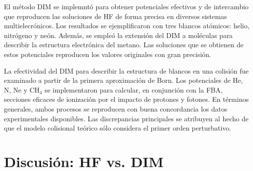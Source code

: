 El método DIM se implemntó para obtener potenciales efectivos y de 
intercambio que reproducen las soluciones de HF de forma precisa en 
diversos sistemas multielecrónicos. Los resultados se ejemplificaron con 
tres blancos atómicos: helio, nitrógeno y neón. Además, se empleó la 
extensión del DIM a moléculas para describir la estructura electrónica 
del metano. Las soluciones que se obtienen de estos potenciales 
reproducen los valores originales con gran precisión. 

La efectividad del DIM para describir la estructura de blancos en una 
colisión fue examinado a partir de la primera aproximación de Born. Los 
potenciales de He, N, Ne y CH$_4$ se implementaron para calcular, en 
conjunción con la FBA, secciones eficaces de ionización por el impacto 
de protones y fotones. En términos generales, ambos procesos se 
reproducen con buena concordancia los datos experimentales disponibles. 
Las discrepancias principales se atribuyen al hecho de que el modelo 
colisional teórico sólo considera el primer orden perturbativo. 


\section{Discusión: HF vs. DIM}
\label{sec:discusionHF}

\begin{comment}
En esta Seccion se examinan los defectos de las cargas invertidas 
encontradas en la Sección~\ref{subsec:invHF} desde el punto de vista 
teórico. Se usan dos ejemplos para ilustrar el comportamiento de los 
nodos de los orbitales radiales, su decaimiento asintótico y los nodos 
espúreos y un experimento numérico. Sin embargo, este tratamiento 
puede generalizar para los orbitales HF de cualquier átomo no 
relativista. 

En esta instancia, se considera necesario recalcar que esta discusión no 
pone en tela de juicio al método de Hartree--Fock, que tiene una teoría 
formal exacta y constituye una de las aproximaciones más importantes en 
la eterna búsqueda de resolver la estructura de sistemas 
multielectrónicos. Se debe tener en mente que esta discusión se da en 
términos de la búsqueda de un potencial efectivo local que nos permita 
describir el estado inicial y final de un blanco en una colisión de 
forma directa. 
\end{comment}

